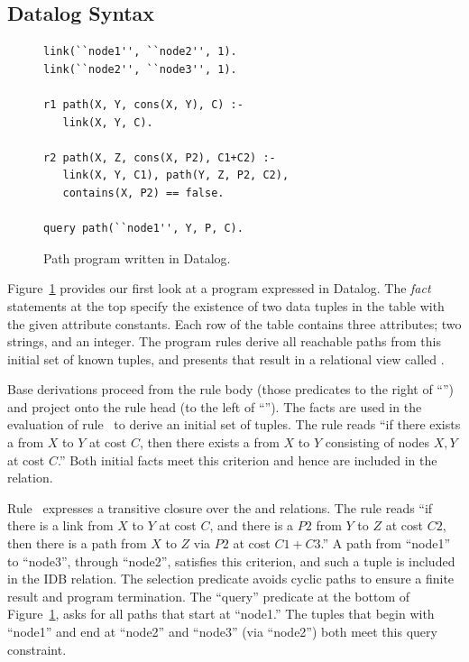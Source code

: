 \subsection{Datalog Syntax}

\begin{figure}
\ssp
\begin{lstlisting}
link(``node1'', ``node2'', 1).
link(``node2'', ``node3'', 1).

r1 path(X, Y, cons(X, Y), C) :- 
   link(X, Y, C). 

r2 path(X, Z, cons(X, P2), C1+C2) :- 
   link(X, Y, C1), path(Y, Z, P2, C2),
   contains(X, P2) == false.

query path(``node1'', Y, P, C).
\end{lstlisting}
\caption{\label{ch:p2:fig:datalogPath}Path program written in Datalog.}
\end{figure}

Figure~\ref{ch:p2:fig:datalogPath} provides our first look at a program
expressed in Datalog.  The {\em fact} statements at the top specify the
existence of two data tuples in the  table with the given attribute
constants.  Each row of the  table contains three attributes; two
strings, and an integer.  The program rules derive all reachable paths from
this initial set of known  tuples, and presents that result in a
relational view called .

Base derivations proceed from the rule body (those predicates to the right of
``\ol{:-}'') and project onto the rule head (to the left of ``\ol{:-}'').  The
 facts are used in the evaluation of rule~ to derive an initial
set of  tuples.  The rule reads ``if there exists a  from $X$
to $Y$ at cost $C$, then there exists a  from $X$ to $Y$ consisting of
nodes $X, Y$ at cost $C$.'' Both initial facts meet this criterion and hence
are included in the  relation.

Rule~ expresses a transitive closure over the  and 
relations.  The rule reads ``if there is a link from $X$ to $Y$ at cost $C$,
and there is a  $P2$ from $Y$ to $Z$ at cost $C2$, then there is a
path from $X$ to $Z$ via $P2$ at cost $C1+C3$.'' A path from ``node1'' to
``node3'', through ``node2'', satisfies this criterion, and such a tuple is
included in the  IDB relation.  The selection predicate
 avoids cyclic paths to ensure a finite result and
program termination.  The ``query'' predicate at the bottom of
Figure~\ref{ch:p2:fig:datalogPath}, asks for all paths that start at ``node1.''
The  tuples that begin with ``node1'' and end at ``node2'' and
``node3'' (via ``node2'') both meet this query constraint.

